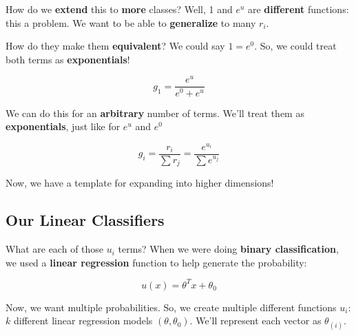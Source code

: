         How do we \textbf{extend} this to \textbf{more} classes? Well, 1 and $e^u$ are \textbf{different} functions: this a problem. We want to be able to \textbf{generalize} to many $r_i$. 
        
        How do they make them \textbf{equivalent}? We could say $1=e^0$. So, we could treat both terms as \textbf{exponentials}!
        
        \begin{equation}
            g_1 = \frac{e^u}{e^0+e^u}
        \end{equation}
        
        We can do this for an \textbf{arbitrary} number of terms. We'll treat them as \textbf{exponentials}, just like for $e^u$ and $e^0$
        
        \begin{equation}
             g_i 
            =             \frac{r_i}{\sum r_j} 
            = 
            \frac{e^{u_i}}{\sum e^{u_j}}
        \end{equation}

        Now, we have a template for expanding into higher dimensions!
        
    \subsection*{Our Linear Classifiers}
    
        What are each of those $u_i$ terms? When we were doing \textbf{binary classification}, we used a \textbf{linear regression} function to help generate the probability:
        
        \begin{equation}
            u(x) = \theta^Tx+\theta_0
        \end{equation}

        Now, we want multiple probabilities. So, we create multiple different functions $u_i$: $k$ different linear regression models $(\theta,\theta_0)$. We'll represent each vector as $\theta_{(i)}$.
        
